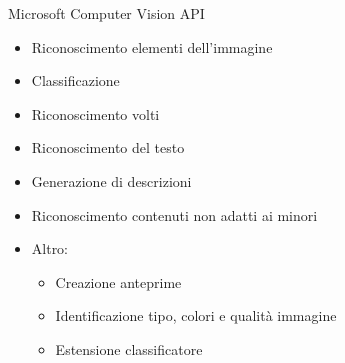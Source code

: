 %
\begin{frame}[t]{Microsoft Computer Vision API}
\begin{itemize}
	\item Riconoscimento elementi dell'immagine
	\item Classificazione
	\item Riconoscimento volti
	\item Riconoscimento del testo
	\item Generazione di descrizioni
	\item Riconoscimento contenuti non adatti ai minori
	\item Altro:
	\begin{itemize}
		\item Creazione anteprime
		\item Identificazione tipo, colori e qualità immagine
		\item Estensione classificatore
	\end{itemize}
\end{itemize}
\end{frame}
%
